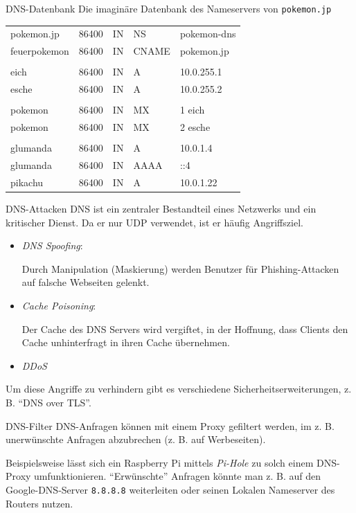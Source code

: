 \begin{example}{DNS-Datenbank}
    Die imaginäre Datenbank des Nameservers von \texttt{pokemon.jp}

    \begin{center}
        \begin{tabular}{TTTTT}
            pokemon.jp   & 86400 & IN & NS    & pokemon-dns \\
            feuerpokemon & 86400 & IN & CNAME & pokemon.jp  \\
            \\
            eich         & 86400 & IN & A     & 10.0.255.1  \\
            esche        & 86400 & IN & A     & 10.0.255.2  \\
            \\
            pokemon      & 86400 & IN & MX    & 1 eich      \\
            pokemon      & 86400 & IN & MX    & 2 esche     \\
            \\
            glumanda     & 86400 & IN & A     & 10.0.1.4    \\
            glumanda     & 86400 & IN & AAAA  & ::4         \\
            pikachu      & 86400 & IN & A     & 10.0.1.22   \\
        \end{tabular}
    \end{center}
\end{example}

\begin{bonus}{DNS-Attacken}
    DNS ist ein zentraler Bestandteil eines Netzwerks und ein kritischer Dienst.
    Da er nur UDP verwendet, ist er häufig Angriffsziel.

    \begin{itemize}
        \item \emph{DNS Spoofing}:

              Durch Manipulation (Maskierung) werden Benutzer für Phishing-Attacken auf falsche Webseiten gelenkt.
        \item \emph{Cache Poisoning}:

              Der Cache des DNS Servers wird vergiftet, in der Hoffnung, dass Clients den Cache unhinterfragt in ihren Cache übernehmen.
        \item \emph{DDoS}
    \end{itemize}

    Um diese Angriffe zu verhindern gibt es verschiedene Sicherheitserweiterungen, z. B. \enquote{DNS over TLS}.
\end{bonus}

\begin{bonus}{DNS-Filter}
    DNS-Anfragen können mit einem Proxy gefiltert werden, im z. B. unerwünschte Anfragen abzubrechen (z. B. auf Werbeseiten).

    Beispielsweise lässt sich ein Raspberry Pi mittels \emph{Pi-Hole} zu solch einem DNS-Proxy umfunktionieren.
    \enquote{Erwünschte} Anfragen könnte man z. B. auf den Google-DNS-Server \texttt{8.8.8.8} weiterleiten oder seinen Lokalen Nameserver des Routers nutzen.
\end{bonus}
